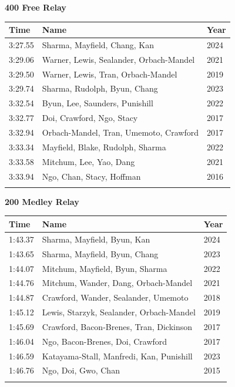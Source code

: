 \vspace{1.2em}
\noindent\begin{minipage}[t]{0.98\textwidth}
\centering
\textbf{\textcolor{teamprimary}{400 Free Relay}}\par
\vspace{0.5em}
\centering
\small
\renewcommand{\arraystretch}{1.0}
\setlength{\tabcolsep}{4pt}
\begin{tabular}{@{}p{4.5cm}p{8.5cm}p{2.5cm}@{}}
\toprule
\textbf{Time} & \textbf{Name} & \textbf{Year} \\
\midrule
3:27.55 & Sharma, Mayfield, Chang, Kan & 2024 \\
3:29.06 & Warner, Lewis, Sealander, Orbach-Mandel & 2021 \\
3:29.50 & Warner, Lewis, Tran, Orbach-Mandel & 2019 \\
3:29.74 & Sharma, Rudolph, Byun, Chang & 2023 \\
3:32.54 & Byun, Lee, Saunders, Punishill & 2022 \\
3:32.77 & Doi, Crawford, Ngo, Stacy & 2017 \\
3:32.94 & Orbach-Mandel, Tran, Umemoto, Crawford & 2017 \\
3:33.34 & Mayfield, Blake, Rudolph, Sharma & 2022 \\
3:33.58 & Mitchum, Lee, Yao, Dang & 2021 \\
3:33.94 & Ngo, Chan, Stacy, Hoffman & 2016 \\
\bottomrule
\vspace{0.5em}
\end{tabular}
\end{minipage}
\vspace{1.2em}
\noindent\begin{minipage}[t]{0.98\textwidth}
\centering
\textbf{\textcolor{teamprimary}{200 Medley Relay}}\par
\vspace{0.5em}
\centering
\small
\renewcommand{\arraystretch}{1.0}
\setlength{\tabcolsep}{4pt}
\begin{tabular}{@{}p{4.5cm}p{8.5cm}p{2.5cm}@{}}
\toprule
\textbf{Time} & \textbf{Name} & \textbf{Year} \\
\midrule
1:43.37 & Sharma, Mayfield, Byun, Kan & 2024 \\
1:43.65 & Sharma, Mayfield, Byun, Chang & 2023 \\
1:44.07 & Mitchum, Mayfield, Byun, Sharma & 2022 \\
1:44.76 & Mitchum, Wander, Dang, Orbach-Mandel & 2021 \\
1:44.87 & Crawford, Wander, Sealander, Umemoto & 2018 \\
1:45.12 & Lewis, Starzyk, Sealander, Orbach-Mandel & 2019 \\
1:45.69 & Crawford, Bacon-Brenes, Tran, Dickinson & 2017 \\
1:46.04 & Ngo, Bacon-Brenes, Doi, Crawford & 2017 \\
1:46.59 & Katayama-Stall, Manfredi, Kan, Punishill & 2023 \\
1:46.76 & Ngo, Doi, Gwo, Chan & 2015 \\
\bottomrule
\vspace{0.5em}
\end{tabular}
\end{minipage}
